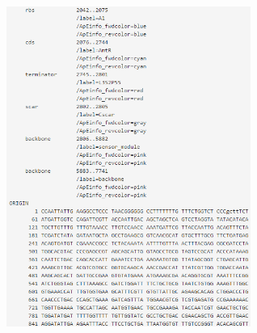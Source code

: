\documentclass[11pt]{article}
\begin{document}
\begin{figure}[ht!]
\includegraphics[width=8cm,height=20cm,keepaspectratio]{fout_2.png}
\label{sbol and plasmid log snapshots}
\end{figure}
\end{document}
